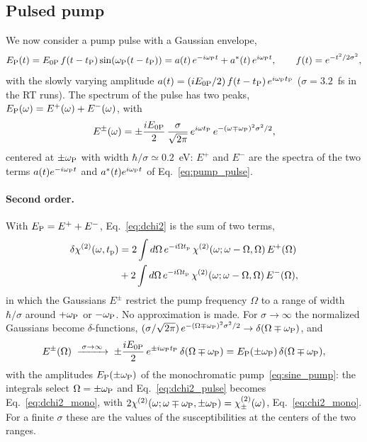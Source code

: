 \documentclass[10pt,a4paper]{paper}
\begin{document}
\subsection{Pulsed pump}
\label{sec:theory_pulse}

We now consider a pump pulse with a Gaussian envelope,
\begin{equation}
E_{\mathrm{P}}(t) = E_{0\mathrm{P}}\,f(t-t_{\mathrm{P}})\sin(\omega_{\mathrm{P}}(t-t_{\mathrm{P}})) = a(t)\,e^{-i\omega_{\mathrm{P}} t}+a^*(t)\,e^{i\omega_{\mathrm{P}} t} , \qquad
f(t) = e^{-t^2/2\sigma^2} ,
\label{eq:pump_pulse}
\end{equation}
with the slowly varying amplitude $a(t) = (iE_{0\mathrm{P}}/2)\,f(t-t_{\mathrm{P}})\,e^{i\omega_{\mathrm{P}}t_{\mathrm{P}}}$ ($\sigma = 3.2$~fs in the RT runs). The spectrum of the pulse has two peaks, $E_{\mathrm{P}}(\omega) = E^+(\omega)+E^-(\omega)$, with
\begin{equation}
E^\pm(\omega) = \pm\frac{iE_{0\mathrm{P}}}{2}\,\frac{\sigma}{\sqrt{2\pi}}\,e^{i\omega t_{\mathrm{P}}}\,e^{-(\omega\mp\omega_{\mathrm{P}})^2\sigma^2/2} ,
\label{eq:pump_spectrum}
\end{equation}
centered at $\pm\omega_{\mathrm{P}}$ with width $\hbar/\sigma\simeq0.2$~eV: $E^+$ and $E^-$ are the spectra of the two
terms $a(t)e^{-i\omega_{\mathrm{P}} t}$ and $a^*(t)e^{i\omega_{\mathrm{P}} t}$ of Eq.~\eqref{eq:pump_pulse}.

\paragraph{Second order.} With $E_{\mathrm{P}} = E^++E^-$, Eq.~\eqref{eq:dchi2} is the sum of two terms,
\begin{align}
\delta\chi^{(2)}(\omega,t_{\mathrm{p}}) &= 2\int d\Omega\,e^{-i\Omega t_{\mathrm{p}}}\,\chi^{(2)}(\omega;\omega-\Omega,\Omega)\,E^+(\Omega)
\nonumber\\
&+ 2\int d\Omega\,e^{-i\Omega t_{\mathrm{p}}}\,\chi^{(2)}(\omega;\omega-\Omega,\Omega)\,E^-(\Omega) ,
\label{eq:dchi2_pulse}
\end{align}
in which the Gaussians $E^\pm$ restrict the pump frequency $\Omega$ to a range of width $\hbar/\sigma$ around $+\omega_{\mathrm{P}}$ or
$-\omega_{\mathrm{P}}$. No approximation is made. For $\sigma\to\infty$ the normalized Gaussians become $\delta$-functions,
$(\sigma/\sqrt{2\pi})\,e^{-(\Omega\mp\omega_{\mathrm{P}})^2\sigma^2/2}\to\delta(\Omega\mp\omega_{\mathrm{P}})$, and
\begin{equation*}
E^\pm(\Omega)\;\xrightarrow{\;\sigma\to\infty\;}\;\pm\frac{iE_{0\mathrm{P}}}{2}\,e^{\pm i\omega_{\mathrm{P}}t_{\mathrm{P}}}\,\delta(\Omega\mp\omega_{\mathrm{P}})
= E_{\mathrm{P}}(\pm\omega_{\mathrm{P}})\,\delta(\Omega\mp\omega_{\mathrm{P}}) ,
\end{equation*}
with the amplitudes $E_{\mathrm{P}}(\pm\omega_{\mathrm{P}})$ of the monochromatic pump~\eqref{eq:sine_pump}: the integrals select
$\Omega = \pm\omega_{\mathrm{P}}$ and Eq.~\eqref{eq:dchi2_pulse} becomes Eq.~\eqref{eq:dchi2_mono}, with
$2\chi^{(2)}(\omega;\omega\mp\omega_{\mathrm{P}},\pm\omega_{\mathrm{P}}) = \chi^{(2)}_\pm(\omega)$, Eq.~\eqref{eq:chi2_mono}. For a finite $\sigma$
these are the values of the susceptibilities at the centers of the two ranges.
\end{document}
